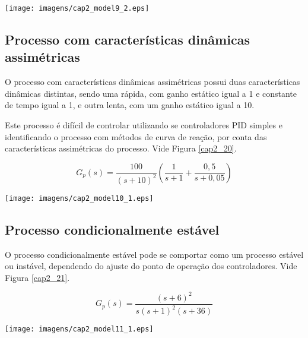    \begin{center}
        \texttt{[image: imagens/cap2\_model9\_2.eps]}
        \label{cap2_19}
    \end{center}

\subsection{Processo com características dinâmicas assimétricas}
    
    O processo com características dinâmicas assimétricas possui duas características
    dinâmicas distintas, sendo uma rápida, com ganho estático igual a 1 e constante
    de tempo igual a 1, e outra lenta, com um ganho estático igual a 10.
    
    Este processo é difícil de controlar utilizando se controladores \acs{PID}
    simples e identificando o processo com métodos de curva de reação, por conta das
    características assimétricas do processo. Vide Figura \ref{cap2_20}.
    
    \begin{equation}
        G_p(s) = \frac{100}{(s+10)^2}\left ( \frac{1}{s+1} + \frac{0,5}{s+0,05} \right )
    \end{equation}
    
    \begin{center}
        \texttt{[image: imagens/cap2\_model10\_1.eps]}
        \label{cap2_20}
    \end{center}

\subsection{Processo condicionalmente estável}
    
    O processo condicionalmente estável pode se comportar como um processo estável
    ou instável, dependendo do ajuste do ponto de operação dos controladores.
    Vide Figura \ref{cap2_21}.
    
    \begin{equation}
        G_p(s) = \frac{(s+6)^2}{s(s+1)^2 (s+36)}
    \end{equation}
    
    \begin{center}
        \texttt{[image: imagens/cap2\_model11\_1.eps]}
        \label{cap2_21}
    \end{center}

